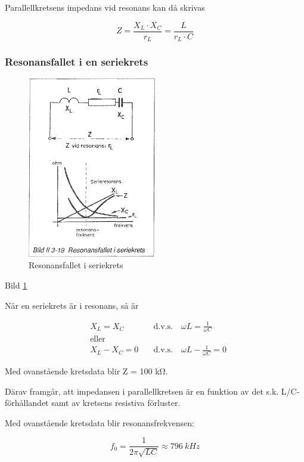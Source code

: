 Parallellkretsens impedans vid resonans kan då skrivas

\[
Z = \frac{X_L \cdot X_C}{r_L} = \frac{L}{r_L \cdot C}
\]

\subsubsection{Resonansfallet i en seriekrets}
\label{serieresonans}

\begin{figure}
\includegraphics[width=0.5\textwidth]{images/bild_2_3-19}
\caption{Resonansfallet i seriekrets}
\label{fig:BildII3-19}
\end{figure}

Bild \ref{fig:BildII3-19}

När en seriekrets är i resonans, så är

\begin{align*}
& X_L = X_C \quad & \text{d.v.s.} \quad \omega L = \frac{1}{\omega C} \\
& \text{eller} & \\
& X_L - X_C = 0 \quad & \text{d.v.s.} \quad \omega L - \frac{1}{\omega C} = 0
\end{align*}

Med ovanstående kretsdata blir Z = 100 kΩ.

Därav framgår, att impedansen i parallellkretsen är en funktion av det s.k.
L/C-förhållandet samt av kretsens resistiva förluster.

Med ovanstående kretsdata blir resonansfrekvensen:

\[
f_0 = \frac{1}{2π\sqrt{LC}} \approx 796\ kHz
\]

